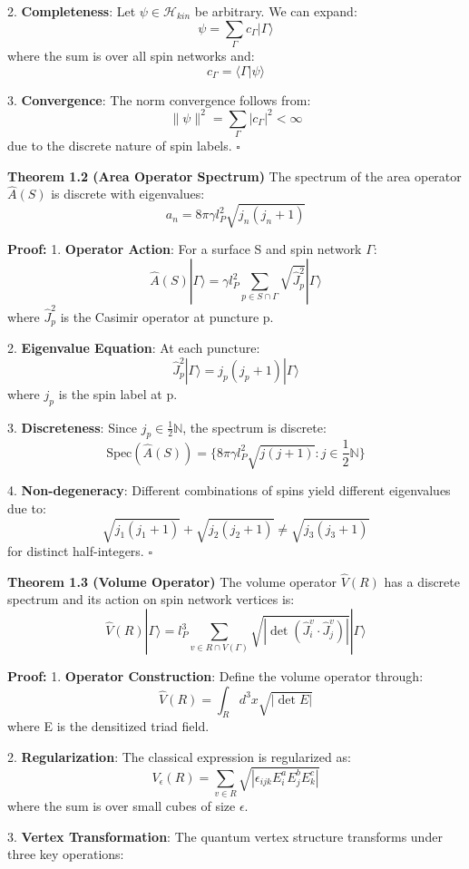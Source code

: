 \documentclass[12pt,a4paper]{article}
\begin{document}
2. \textbf{Completeness}:
   Let $\psi \in \mathcal{H}_{kin}$ be arbitrary. We can expand:
   \[
   \psi = \sum_{\Gamma} c_\Gamma |\Gamma\rangle
   \]
   where the sum is over all spin networks and:
   \[
   c_\Gamma = \langle\Gamma|\psi\rangle
   \]

3. \textbf{Convergence}:
   The norm convergence follows from:
   \[
   \|\psi\|^2 = \sum_{\Gamma} |c_\Gamma|^2 < \infty
   \]
   due to the discrete nature of spin labels. $\square$

\textbf{Theorem 1.2 (Area Operator Spectrum)}
The spectrum of the area operator $\hat{A}(S)$ is discrete with eigenvalues:
\[
a_n = 8\pi\gamma l_P^2\sqrt{j_n(j_n+1)}
\]

\textbf{Proof:}
1. \textbf{Operator Action}:
   For a surface S and spin network $\Gamma$:
   \[
   \hat{A}(S)|\Gamma\rangle = \gamma l_P^2 \sum_{p \in S \cap \Gamma} \sqrt{\hat{J}_p^2}|\Gamma\rangle
   \]
   where $\hat{J}_p^2$ is the Casimir operator at puncture p.

2. \textbf{Eigenvalue Equation}:
   At each puncture:
   \[
   \hat{J}_p^2|\Gamma\rangle = j_p(j_p+1)|\Gamma\rangle
   \]
   where $j_p$ is the spin label at p.

3. \textbf{Discreteness}:
   Since $j_p \in \frac{1}{2}\mathbb{N}$, the spectrum is discrete:
   \[
   \text{Spec}(\hat{A}(S)) = \{8\pi\gamma l_P^2\sqrt{j(j+1)} : j \in \frac{1}{2}\mathbb{N}\}
   \]

4. \textbf{Non-degeneracy}:
   Different combinations of spins yield different eigenvalues due to:
   \[
   \sqrt{j_1(j_1+1)} + \sqrt{j_2(j_2+1)} \neq \sqrt{j_3(j_3+1)}
   \]
   for distinct half-integers. $\square$

\textbf{Theorem 1.3 (Volume Operator)}
The volume operator $\hat{V}(R)$ has a discrete spectrum and its action on spin network vertices is:
\[
\hat{V}(R)|\Gamma\rangle = l_P^3 \sum_{v \in R \cap V(\Gamma)} \sqrt{|\det(\hat{J}_i^v \cdot \hat{J}_j^v)|}|\Gamma\rangle
\]

\textbf{Proof:}
1. \textbf{Operator Construction}:
   Define the volume operator through:
   \[
   \hat{V}(R) = \int_R d^3x \sqrt{|\det E|}
   \]
   where E is the densitized triad field.

2. \textbf{Regularization}:
   The classical expression is regularized as:
   \[
   V_\epsilon(R) = \sum_{v \in R} \sqrt{|\epsilon_{ijk}E_i^aE_j^bE_k^c|}
   \]
   where the sum is over small cubes of size $\epsilon$.

3. \textbf{Vertex Transformation}:
   The quantum vertex structure transforms under three key operations:
   
\end{document}
